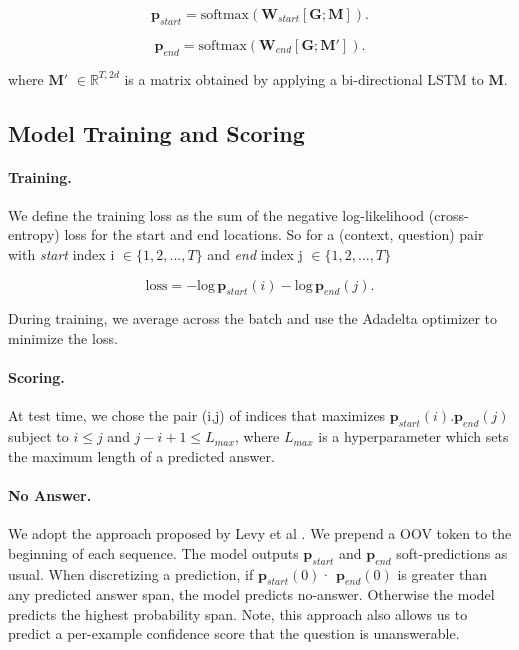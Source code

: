 \begin{equation}
\bm{p}_{start} = \text{softmax}(\bm{W}_{start}[\bm{G}; \bm{M}]).
\end{equation}

\begin{equation}
\bm{p}_{end} = \text{softmax}(\bm{W}_{end}[\bm{G}; \bm{M'}]).
\end{equation}

where $\bm{M'}$  $\in \mathbb{R}^{T, 2d}$ is a matrix obtained by applying a bi-directional LSTM to $\bm{M}$.


 
\subsection{Model Training and Scoring}
\label{subsec:modeltrainingandscoring}

\paragraph{Training.} We define the training loss as the sum of the negative log-likelihood (cross-entropy) loss for the start and end locations. So for a (context, question) pair with \textit{start} index {i} $\in \{1, 2, ..., T\}$ and \textit{end} index {j} $\in \{1, 2, ..., T\}$

\begin{equation}
\text{loss} = - \text{log} \, \bm{p}_{start}(i) - \text{log} \, \bm{p}_{end}(j).
\end{equation}

During training, we average across the batch and use the Adadelta optimizer \cite{zeiler2012adadelta} to minimize the loss.

\paragraph{Scoring.} At test time, we chose the pair (i,j) of indices that maximizes $\bm{p}_{start}(i).\bm{p}_{end}(j)$ subject to $i \leq j$ and $j - i + 1 \leq L_{max}$, where $L_{max}$ is a hyperparameter which sets the maximum length of a predicted answer.  

\paragraph{No Answer.}  We adopt the approach proposed by Levy et al \cite{levy2017zero}. We prepend a OOV token to the beginning of each sequence. The model outputs $\bm{p}_{start}$ and $\bm{p}_{end}$ soft-predictions as usual. When discretizing a prediction, if $\bm{p}_{start}(0)$· $\bm{p}_{end}(0)$ is greater than any predicted answer span, the model predicts no-answer. Otherwise the model predicts the highest probability span. Note, this approach also allows us to predict a per-example confidence score that the question is unanswerable.